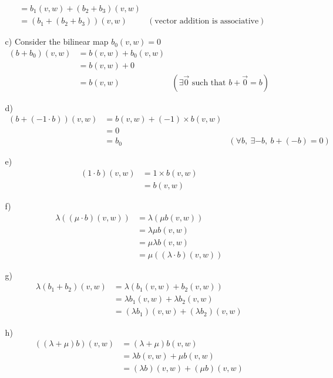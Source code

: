 \documentclass{article}
\begin{document}
\begin{itemize}
\begin{itemize}
\begin{align*}
            &=b_1(v,w)+(b_2+b_3)(v,w)\\
            &=(b_1+(b_2+b_3))(v,w) &(\text{vector addition is associative})
        \end{align*}
        \item [c)] Consider the bilinear map \(b_0(v,w)=0\)
        \begin{align*}
            (b+b_0)(v,w) &=b(v,w)+b_0(v,w)\\
            &=b(v,w)+0\\
            &=b(v,w)&(\exists \overrightarrow{0} \text{ such that }b+\overrightarrow{0}=b)
        \end{align*}
        \item [d)]
        \begin{align*}
            (b+(-1\cdot b))(v,w)&=b(v,w)+(-1)\times b(v,w)\\
            &=0\\
            &=b_0& (\forall b,\ \exists-b,\ b+(-b)=0)
        \end{align*}
        \item [e)]
        \begin{align*}
            (1\cdot b)(v,w)&=1\times b(v,w)\\
            &=b(v,w)
        \end{align*}
        \newpage
        \item [f)]
        \begin{align*}
            \lambda((\mu \cdot b)(v,w))&=\lambda(\mu b(v,w))\\
            &=\lambda\mu b(v,w)\\
            &=\mu\lambda b(v,w)\\
            &=\mu(( \lambda\cdot b)(v,w))
        \end{align*}
        \item [g)]
        \begin{align*}
            \lambda(b_1+b_2)(v,w)&=\lambda(b_1(v,w)+b_2(v,w))\\
            &=\lambda b_1(v,w)+\lambda b_2(v,w)\\
            &=(\lambda b_1)(v,w)+(\lambda b_2)(v,w)
        \end{align*}
        \item [h)]
        \begin{align*}
            ((\lambda+\mu)b)(v,w)&=(\lambda + \mu)b(v,w)\\
            &=\lambda b(v,w)+\mu b(v,w)\\
            &=(\lambda b)(v,w)+(\mu b)(v,w)

\end{align*}
\end{itemize}
\end{itemize}
\end{document}
